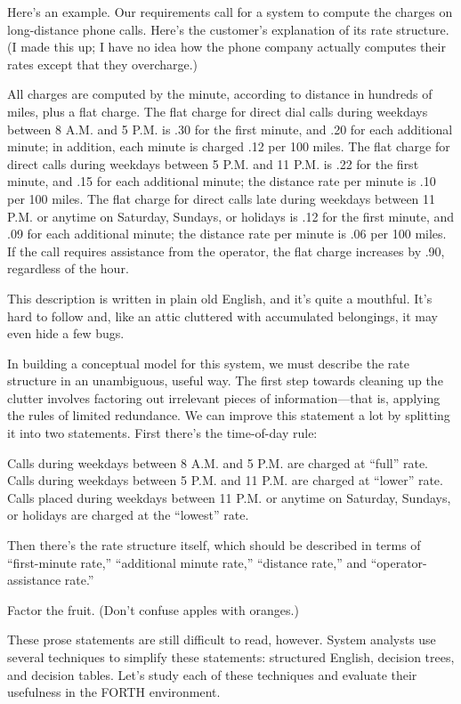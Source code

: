 Here's an example. Our requirements call for a system to compute
the charges on long-distance phone calls. Here's the customer's
explanation of its rate structure. (I made this up; I have no idea how the phone
company actually computes their rates except that they overcharge.)

\begin{tfquot}
All charges are computed by the minute, according to distance in
hundreds of miles, plus a flat charge. The flat charge for direct dial
calls during weekdays between 8 A.M. and 5 P.M. is .30 for the first
minute, and .20 for each additional minute; in addition, each minute
is charged .12 per 100 miles. The flat charge for direct calls during
weekdays between 5 P.M. and 11 P.M. is .22 for the first minute, and
.15 for each additional minute; the distance rate per minute is .10
per 100 miles. The flat charge for direct calls late during weekdays
between 11 P.M. or anytime on Saturday, Sundays, or holidays is .12
for the first minute, and .09 for each additional minute; the distance
rate per minute is .06 per 100 miles. If the call requires assistance
from the operator, the flat charge increases by .90, regardless of the hour.
\end{tfquot}
This description is written in plain old English, and it's quite a
mouthful.  It's hard to follow and, like an attic cluttered with
accumulated belongings, it may even hide a few bugs.


In building a conceptual model for this system, we must describe the
rate structure in an unambiguous, useful way. The first step towards
cleaning up the clutter involves factoring out irrelevant pieces of
information---that is, applying the rules of limited redundance. We
can improve this statement a lot by splitting it into two statements.
First there's the time-of-day rule:

\begin{tfquot}
Calls during weekdays between 8 A.M. and 5 P.M. are charged at ``full'' rate.
Calls during weekdays between 5 P.M. and 11 P.M. are charged at ``lower''
rate. Calls placed during weekdays between 11 P.M. or anytime on Saturday,
Sundays, or holidays are charged at the ``lowest'' rate.
\end{tfquot}
Then there's the rate structure itself, which should be described in
terms of ``first-minute rate,'' ``additional minute rate,'' ``distance
rate,'' and ``operator-assistance rate.''

\begin{tip}
Factor the fruit. (Don't confuse apples with oranges.)
\end{tip}
These prose statements are still difficult to read, however. System
analysts use several techniques to simplify these statements:
structured English, decision trees, and decision tables. Let's study
each of these techniques and evaluate their usefulness in the FORTH
environment.

